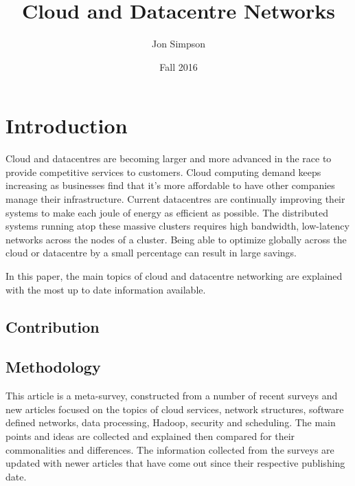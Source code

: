 \documentclass[fullapage,12pt]{article}
\title{Cloud and Datacentre Networks}
\author{Jon Simpson}
\date{Fall 2016}
\begin{document}
\begin{titlepage}
\maketitle
\thispagestyle{empty}
\end{titlepage}

\section{Introduction} \label{sec:introduction}

Cloud and datacentres are becoming larger and more advanced in the race to provide competitive services to customers. Cloud computing demand keeps increasing as businesses find that it's more affordable to have other companies manage their infrastructure. Current datacentres are continually improving their systems to make each joule of energy as efficient as possible. The distributed systems running atop these massive clusters requires high bandwidth, low-latency networks across the nodes of a cluster. Being able to optimize globally across the cloud or datacentre by a small percentage can result in large savings.

In this paper, the main topics of cloud and datacentre networking are explained with the most up to date information available.



\subsection{Contribution} \label{sub:contribution}

\subsection{Methodology} \label{sub:methodology}

This article is a meta-survey, constructed from a number of recent surveys and new articles focused on the topics of cloud services, network structures, software defined networks, data processing, Hadoop, security and scheduling. The main points and ideas are collected and explained then compared for their commonalities and differences. The information collected from the surveys are updated with newer articles that have come out since their respective publishing date.

\end{document}
